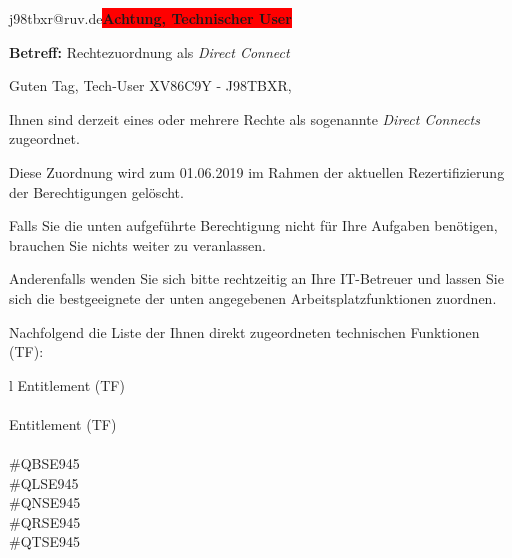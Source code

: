 \documentclass[a4paper,landscape,12pt]{letter}
\begin{document}
\begin{letter}{j98tbxr@ruv.de\space\space\space\space\space\space\space\space\space\bfseries\colorbox{red}{Achtung, Technischer User}\hfill \break}
\begin{normalsize}
	\opening{\textbf{Betreff:} Rechtezuordnung als \emph{Direct Connect}}
	\begin{normalsize} \hfill
	\end{normalsize}

	\begin{normalsize}
		Guten Tag, 
	Tech-User XV86C9Y - J98TBXR, \hfill \break
	\end{normalsize}
	\end{normalsize}
	
\begin{normalsize}
	Ihnen sind derzeit eines oder mehrere Rechte als sogenannte \emph{Direct Connects} zugeordnet.
	
	Diese Zuordnung wird zum 01.06.2019 im Rahmen der aktuellen Rezertifizierung der Berechtigungen gelöscht.
	
	Falls Sie die unten aufgeführte Berechtigung nicht für Ihre Aufgaben benötigen, 
	brauchen Sie nichts weiter zu veranlassen.
	
	Anderenfalls wenden Sie sich bitte rechtzeitig an Ihre IT-Betreuer 
	und lassen Sie sich die bestgeeignete der unten angegebenen Arbeitsplatzfunktionen zuordnen.
	\end{normalsize}
	
\begin{normalsize}
	Nachfolgend die Liste der Ihnen direkt zugeordneten technischen Funktionen (TF):

	\begin{longtable}{l}
		Entitlement (TF) \\ \hline
		\endfirsthead
		\\\hline
		Entitlement (TF) \\ \hline
		\endhead %
		\multicolumn{1}{r@{}}{Fortsetzung \ldots}\\
		\endfoot
		\hline
		\endlastfoot
	\#QBSE945\\\#QLSE945\\\#QNSE945\\\#QRSE945\\\#QTSE945\\
	\end{longtable}
	\end{normalsize}
	

\end{letter}
\end{document}
